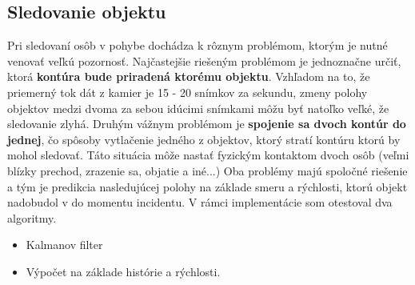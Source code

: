 \subsection{Sledovanie objektu}
Pri sledovaní osôb v pohybe dochádza k rôznym problémom, ktorým je nutné venovať veľkú pozornosť. Najčastejšie riešeným problémom je jednoznačne určiť, ktorá \textbf{kontúra bude priradená ktorému objektu}. Vzhľadom na to, že priemerný tok dát z kamier je 15 - 20 snímkov za sekundu, zmeny polohy objektov medzi dvoma za sebou idúcimi snímkami môžu byť natoľko veľké, že sledovanie zlyhá. Druhým vážnym problémom je \textbf{spojenie sa dvoch kontúr do jednej}, čo spôsoby vytlačenie jedného z objektov, ktorý stratí kontúru ktorú by mohol sledovať. Táto situácia môže nastať fyzickým kontaktom dvoch osôb (veľmi blízky prechod, zrazenie sa, objatie a iné...) Oba problémy majú spoločné riešenie a tým je predikcia nasledujúcej polohy na základe smeru a rýchlosti, ktorú objekt nadobudol v do momentu incidentu.
V rámci implementácie som otestoval dva algoritmy.
\begin{itemize}
\item Kalmanov filter
\item Výpočet na základe histórie a rýchlosti. 
\end{itemize}


